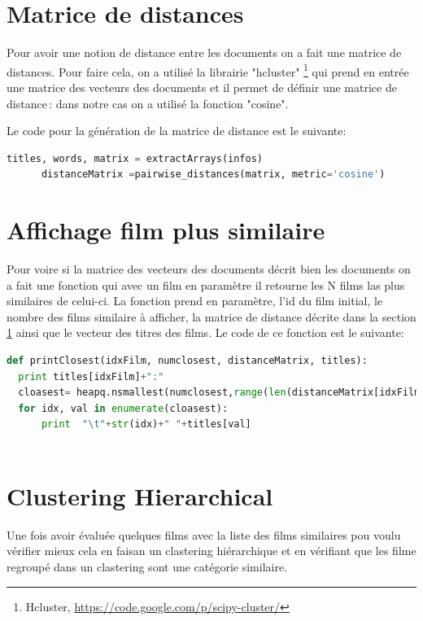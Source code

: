 	\section{Matrice de distances}
	\label{matrice-distance}
	Pour avoir une notion de distance entre les documents on a fait une matrice de distances. Pour faire cela, on a utilisé la librairie "hcluster" \footnote{Hcluster, \url{https://code.google.com/p/scipy-cluster/}} qui prend en entrée une matrice des vecteurs des documents et il permet de définir une matrice de distance : dans notre cas on a utilisé la fonction "cosine".
	
	Le code pour la génération de la matrice de distance est le suivante:
	
	\begin{lstlisting}[language=python]
	  titles, words, matrix = extractArrays(infos)
	  distanceMatrix =pairwise_distances(matrix, metric='cosine')
	\end{lstlisting}
	
	
	\section{Affichage film plus similaire}
	Pour voire si la matrice des vecteurs des documents décrit bien les documents on a fait une fonction qui avec un film en paramètre il retourne les N films las plus similaires de celui-ci.
	La fonction prend en paramètre, l'id du film initial, le nombre des films similaire à afficher, la matrice de distance décrite dans la section \ref{matrice-distance} ainsi que le vecteur des titres des films.
	Le code de ce fonction est le suivante:
	\begin{lstlisting}[language=python]
def printClosest(idxFilm, numclosest, distanceMatrix, titles):
  print titles[idxFilm]+":"
  cloasest= heapq.nsmallest(numclosest,range(len(distanceMatrix[idxFilm])),distanceMatrix[idxFilm].take)
  for idx, val in enumerate(cloasest):
      print  "\t"+str(idx)+" "+titles[val]
  
	\end{lstlisting}
	
	\section{Clustering Hierarchical}
	Une fois avoir évaluée quelques films avec la liste des films similaires pou voulu vérifier mieux  cela en faisan un clastering hiérarchique et en vérifiant que les filme regroupé dans un clastering sont une catégorie similaire.
	
